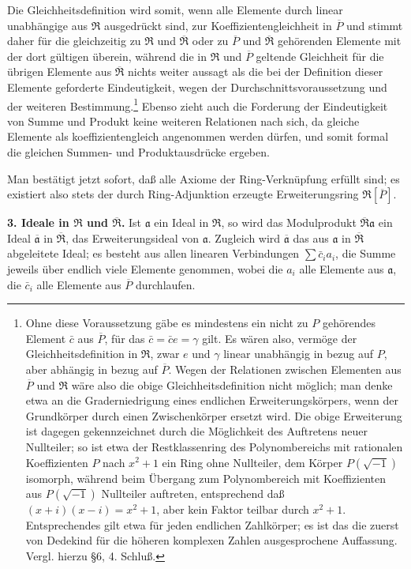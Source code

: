 \documentclass[11pt]{article}
\begin{document}
Die Gleichheitsdefinition wird somit, wenn alle Elemente durch linear unabhängige aus $\mathfrak R$ ausgedrückt sind, zur Koeffizientengleichheit in $\overline P$ und stimmt daher für die gleichzeitig zu $\mathfrak R$ und $\overline{\mathfrak R}$ oder zu $\overline P$ und $\overline{\mathfrak R}$ gehörenden Elemente mit der dort gültigen überein, während die in $\mathfrak R$ und $\overline P$ geltende Gleichheit für die übrigen Elemente aus $\overline{\mathfrak R}$ nichts weiter aussagt als die bei der Definition dieser Elemente geforderte Eindeutigkeit, wegen der Durchschnittsvoraussetzung und der weiteren Bestimmung.\footnote{Ohne diese Voraussetzung gäbe es mindestens ein nicht zu $P$ gehörendes Element $\bar c$ aus $\overline P$, für das $\bar c=\bar c e=\gamma$ gilt. Es wären also, vermöge der Gleichheitsdefinition in $\mathfrak R$, zwar $e$ und $\gamma$ linear unabhängig in bezug auf $P$, aber abhängig in bezug auf $\overline P$. Wegen der Relationen zwischen Elementen aus $\overline P$ und $\mathfrak R$ wäre also die obige Gleichheitsdefinition nicht möglich; man denke etwa an die Graderniedrigung eines endlichen Erweiterungskörpers, wenn der Grundkörper durch einen Zwischenkörper ersetzt wird. Die obige Erweiterung ist dagegen gekennzeichnet durch die Möglichkeit des Auftretens neuer Nullteiler; so ist etwa der Restklassenring des Polynombereichs mit rationalen Koeffizienten $P$ nach $x^2+1$ ein Ring ohne Nullteiler, dem Körper $P(\sqrt{-1})$ isomorph, während beim Übergang zum Polynombereich mit Koeffizienten aus $P(\sqrt{-1})$ Nullteiler auftreten, entsprechend daß $(x+i)(x-i)=x^2+1$, aber kein Faktor teilbar durch $x^2+1$. Entsprechendes gilt etwa für jeden endlichen Zahlkörper; es ist das die zuerst von Dedekind für die höheren komplexen Zahlen ausgesprochene Auffassung. Vergl. hierzu \S 6, 4. Schluß.} Ebenso zieht auch die Forderung der Eindeutigkeit von Summe und Produkt keine weiteren Relationen nach sich, da gleiche Elemente als koeffizientengleich angenommen werden dürfen, und somit formal die gleichen Summen- und Produktausdrücke ergeben.

Man bestätigt jetzt sofort, daß alle Axiome der Ring-Verknüpfung erfüllt sind; es existiert also stets der durch Ring-Adjunktion erzeugte Erweiterungsring $\mathfrak R[\overline P]$.

\textbf{3. Ideale in $\mathfrak R$ und $\overline{\mathfrak R}$.} Ist $\mathfrak a$ ein Ideal in $\mathfrak R$, so wird das Modulprodukt $\overline{\mathfrak R}\mathfrak a$ ein Ideal $\overline{\mathfrak a}$ in $\overline{\mathfrak R}$, das Erweiterungsideal von $\mathfrak a$. Zugleich wird $\overline{\mathfrak a}$ das aus $\mathfrak a$ in $\overline{\mathfrak R}$ abgeleitete Ideal; es besteht aus allen linearen Verbindungen $\sum \bar c_i a_i$, die Summe jeweils über endlich viele Elemente genommen, wobei die $a_i$ alle Elemente aus $\mathfrak a$, die $\bar c_i$ alle Elemente aus $\overline P$ durchlaufen.
\end{document}
